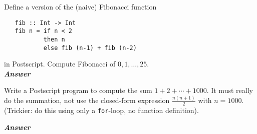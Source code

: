\documentclass[a4paper]{article}
\begin{document}
\begin{exercise} 
Define a version of the (naive) Fibonacci function 

{\codesetup\begin{verbatim}
   fib :: Int -> Int
   fib n = if n < 2 
           then n 
           else fib (n-1) + fib (n-2)
\end{verbatim}}


\noindent 
in Postscript\@.  Compute Fibonacci of $0, 1, \ldots, 25$.  \\

\noindent
\textbf{\emph{Answer}}
\noindent{\color{red}{I'm unsure about this answer (and using Postscript).}}

\end{exercise}

\begin{exercise}
  Write a Postscript program to compute the sum $1+2+\cdots+1000$.  It
  must really do the summation, not use the closed-form expression
  $\frac{n(n+1)}{2}$ with $n=1000$.  (Trickier: do this using only a
  \texttt{for}-loop, no function definition).\\
\end{exercise}

\noindent
\textbf{\emph{Answer}}
\noindent{\color{red}{I'm unsure about this answer (and using Postscript).}}
\end{document}
